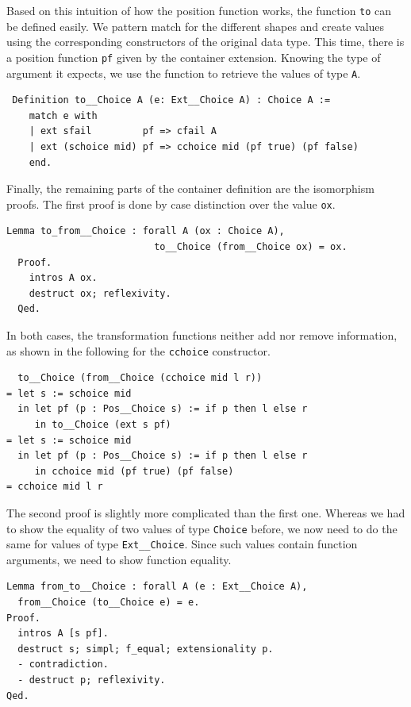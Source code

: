 \documentclass[a4paper, 11pt, fleqn, twoside]{scrreprt}
\newcommand{\cinl}[1]{\texttt{#1}}
\begin{document}
Based on this intuition of how the position function works, the function \cinl{to} can be defined easily.
We pattern match for the different shapes and create values using the corresponding constructors of the original data type.
This time, there is a position function \cinl{pf} given by the container extension.
Knowing the type of argument it expects, we use the function to retrieve the values of type \cinl{A}.

\begin{verbatim}
 Definition to__Choice A (e: Ext__Choice A) : Choice A :=
    match e with
    | ext sfail         pf => cfail A
    | ext (schoice mid) pf => cchoice mid (pf true) (pf false)
    end.
\end{verbatim}

Finally, the remaining parts of the container definition are the isomorphism proofs.
The first proof is done by case distinction over the value \cinl{ox}.

\begin{verbatim}
Lemma to_from__Choice : forall A (ox : Choice A),
                          to__Choice (from__Choice ox) = ox.
  Proof.
    intros A ox.
    destruct ox; reflexivity.
  Qed.
\end{verbatim}

In both cases, the transformation functions neither add nor remove information, as shown in the following for the \cinl{cchoice} constructor.

\begin{verbatim}
  to__Choice (from__Choice (cchoice mid l r))
= let s := schoice mid
  in let pf (p : Pos__Choice s) := if p then l else r
     in to__Choice (ext s pf)
= let s := schoice mid
  in let pf (p : Pos__Choice s) := if p then l else r
     in cchoice mid (pf true) (pf false)
= cchoice mid l r
\end{verbatim}

The second proof is slightly more complicated than the first one.
Whereas we had to show the equality of two values of type \cinl{Choice} before, we now need to do the same for values of type \cinl{Ext__Choice}.
Since such values contain function arguments, we need to show function equality.

\begin{verbatim}
Lemma from_to__Choice : forall A (e : Ext__Choice A),
  from__Choice (to__Choice e) = e.
Proof.
  intros A [s pf].
  destruct s; simpl; f_equal; extensionality p.
  - contradiction.
  - destruct p; reflexivity.
Qed. 
\end{verbatim}
\end{document}
